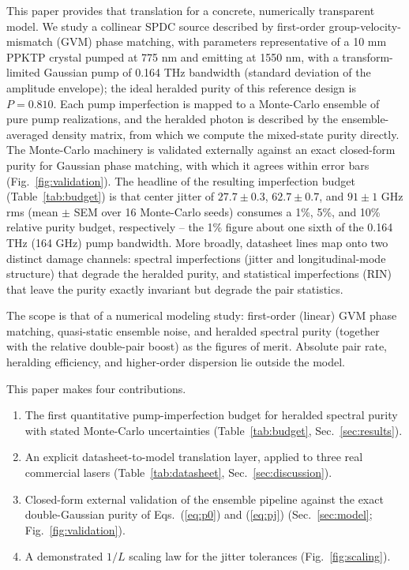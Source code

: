 This paper provides that translation for a concrete, numerically
transparent model. We study a collinear SPDC source described by
first-order group-velocity-mismatch (GVM) phase matching, with
parameters representative of a 10 mm PPKTP crystal pumped at 775 nm and
emitting at 1550 nm, with a transform-limited Gaussian pump of 0.164
THz bandwidth (standard deviation of the amplitude envelope); the
ideal heralded purity of this
reference design is $P = 0.810$. Each
pump imperfection is mapped to a Monte-Carlo ensemble of pure pump
realizations, and the heralded photon is described by the
ensemble-averaged density matrix, from which we compute the mixed-state
purity directly. The Monte-Carlo machinery is validated externally
against an exact closed-form purity for Gaussian phase matching, with
which it agrees within error bars (Fig.~\ref{fig:validation}).
The headline of the resulting imperfection budget
(Table~\ref{tab:budget}) is that center jitter of $27.7 \pm 0.3$,
$62.7 \pm 0.7$, and $91 \pm 1$ GHz rms (mean $\pm$ SEM over 16
Monte-Carlo seeds) consumes a 1\%, 5\%, and 10\% relative purity
budget, respectively -- the 1\% figure about one sixth of the 0.164
THz (164 GHz) pump bandwidth. More broadly, datasheet lines map onto
two distinct damage channels: spectral imperfections (jitter and
longitudinal-mode structure) that degrade the heralded purity, and
statistical imperfections (RIN) that leave the purity exactly
invariant but degrade the pair statistics.

The scope is that of a numerical modeling study: first-order (linear)
GVM phase matching, quasi-static ensemble noise, and heralded spectral
purity (together with the relative double-pair boost) as the figures
of merit. Absolute pair rate, heralding efficiency, and higher-order
dispersion lie outside the model.

This paper makes four contributions.
\begin{enumerate}
\setlength{\itemsep}{0pt}
\item The first quantitative pump-imperfection budget for heralded
  spectral purity with stated Monte-Carlo uncertainties
  (Table~\ref{tab:budget}, Sec.~\ref{sec:results}).
\item An explicit datasheet-to-model translation layer, applied to
  three real commercial lasers (Table~\ref{tab:datasheet},
  Sec.~\ref{sec:discussion}).
\item Closed-form external validation of the ensemble pipeline
  against the exact double-Gaussian purity of Eqs.~(\ref{eq:p0})
  and (\ref{eq:pj}) (Sec.~\ref{sec:model}; Fig.~\ref{fig:validation}).
\item A demonstrated $1/L$ scaling law for the jitter tolerances
  (Fig.~\ref{fig:scaling}).
\end{enumerate}
